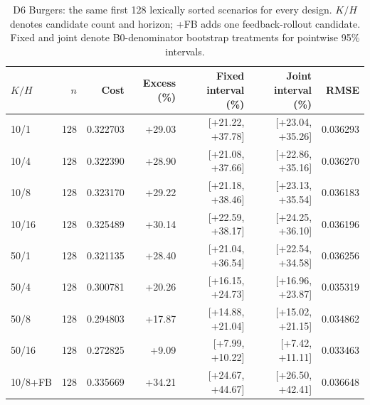 \begin{table}[ht]
\centering\small
\caption{D6 Burgers: the same first 128 lexically sorted scenarios for every design. $K/H$ denotes candidate count and horizon; +FB adds one feedback-rollout candidate. Fixed and joint denote B0-denominator bootstrap treatments for pointwise 95\% intervals.}
\begin{tabular}{@{}lrrrrrr@{}}\toprule
$K/H$ & $n$ & Cost & Excess (\%) & Fixed interval (\%) & Joint interval (\%) & RMSE\\\midrule
10/1 & 128 & 0.322703 & +29.03 & [+21.22, +37.78] & [+23.04, +35.26] & 0.036293\\
10/4 & 128 & 0.322390 & +28.90 & [+21.08, +37.66] & [+22.86, +35.16] & 0.036270\\
10/8 & 128 & 0.323170 & +29.22 & [+21.18, +38.46] & [+23.13, +35.54] & 0.036183\\
10/16 & 128 & 0.325489 & +30.14 & [+22.59, +38.17] & [+24.25, +36.10] & 0.036196\\
50/1 & 128 & 0.321135 & +28.40 & [+21.04, +36.54] & [+22.54, +34.58] & 0.036256\\
50/4 & 128 & 0.300781 & +20.26 & [+16.15, +24.73] & [+16.96, +23.87] & 0.035319\\
50/8 & 128 & 0.294803 & +17.87 & [+14.88, +21.04] & [+15.02, +21.15] & 0.034862\\
50/16 & 128 & 0.272825 & +9.09 & [+7.99, +10.22] & [+7.42, +11.11] & 0.033463\\
10/8+FB & 128 & 0.335669 & +34.21 & [+24.67, +44.67] & [+26.50, +42.41] & 0.036648\\
\bottomrule\end{tabular}
\end{table}
